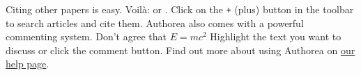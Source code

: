 Citing other papers is easy. Voilà: \cite{2012} or \cite{Holstein_2009}. Click on the \verb|+| (plus) button in the toolbar to search articles and cite them. Authorea also comes with a powerful commenting system. Don't agree that $E  =  mc^{2}$ Highlight the text you want to discuss or click the comment button. Find out more about using Authorea on \href{https://www.authorea.com/help}{our help page}.